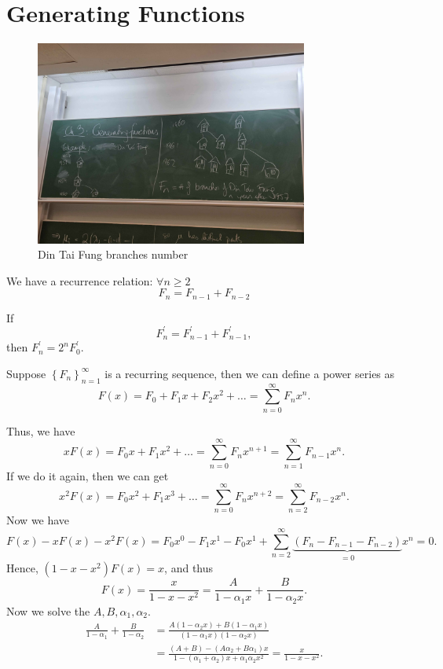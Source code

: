 \chapter{Generating Functions}
\begin{figure}[H]
    \centering
    \includegraphics[width=0.8\textwidth]{./Figures/20250923_165742.jpg}
    \caption{Din Tai Fung branches number}
    \label{fig: fibonacci from ding tai fung}
\end{figure}

We have a recurrence relation: \(\forall n \ge 2\)
\[
    F_n = F_{n - 1}+ F_{n -2}
\] 

\begin{eg}
    If 
    \[
        F_n ^{\prime}  = F_{n-1}^{\prime} + F_{n-1}^{\prime}, 
    \] then \(F_n^{\prime} = 2^n F_0^{\prime} \). 
\end{eg}

Suppose \(\left\{ F_n \right\}_{n=1}^{\infty}  \) is a recurring sequence, then we can define a power series as 
\[
    F(x) = F_0 + F_1 x + F_2 x^2 + \dots = \sum_{n=0}^{\infty} F_n x^n. 
\] 

Thus, we have 
\[
    xF(x) = F_0 x + F_1 x^2 + \dots = \sum_{n=0}^{\infty} F_n x^{n + 1} = \sum_{n=1}^{\infty} F_{n-1} x^n.  
\]
If we do it again, then we can get 
\[
    x^2 F(x) = F_0 x^2 + F_1 x^3 + \dots = \sum_{n=0}^{\infty} F_n x^{n + 2} = \sum_{n=2}^{\infty} F_{n - 2} x^n.  
\]
Now we have 
\[
    F(x) - xF(x) - x^2 F(x) = F_0 x^0 - F_1 x^1 - F_0 x^1 + \sum_{n = 2}^{\infty} \underbrace{\left( F_n - F_{n - 1} - F_{n-2} \right)}_{=0} x^n = 0. 
\]
Hence, \((1 - x - x^2) F(x) = x\), and thus 
\[
    F(x) = \frac{x}{1 - x - x^2} = \frac{A}{1 - \alpha _1 x} + \frac{B}{1 - \alpha _2 x}.
\] 
Now we solve the \(A, B, \alpha _1, \alpha _2\). 
\begin{align*}
    \frac{A}{1 - \alpha _1} + \frac{B}{1 - \alpha _2} &= \frac{A(1 - \alpha _2 x) + B(1 - \alpha _1 x)}{(1 - \alpha _1 x)(1 - \alpha _2 x)} \\
    &= \frac{(A + B) - (A \alpha _2 + B \alpha _1)x}{1 - (\alpha _1 + \alpha _2)x + \alpha _1 \alpha _2 x^2} = \frac{x}{1 - x - x^2}.
\end{align*} 

